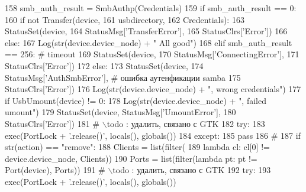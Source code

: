 \begin{DoxyCode}
158                 smb\_auth\_result = SmbAuthp(Credentials)
159                 \textcolor{keywordflow}{if} smb\_auth\_result == 0:
160                     \textcolor{keywordflow}{if} \textcolor{keywordflow}{not} Transfer(device,
161                                     usbdirectory,
162                                     Credentials):
163                         StatusSet(device,
164                                   StatusMsg[\textcolor{stringliteral}{'TransferError'}],
165                                   StatusClrs[\textcolor{stringliteral}{'Error'}])
166                     \textcolor{keywordflow}{else}:
167                         Log(str(device.device\_node) + \textcolor{stringliteral}{" All good"})
168                 \textcolor{keywordflow}{elif} smb\_auth\_result == 256:  \textcolor{comment}{# timeout}
169                     StatusSet(device,
170                               StatusMsg[\textcolor{stringliteral}{'ConnectingError'}],
171                               StatusClrs[\textcolor{stringliteral}{'Error'}])
172                 \textcolor{keywordflow}{else}:
173                     StatusSet(device,
174                               StatusMsg[\textcolor{stringliteral}{'AuthSmbError'}], \textcolor{comment}{# ошибка аутенфикации samba}
175                               StatusClrs[\textcolor{stringliteral}{'Error'}])
176                     Log(str(device.device\_node) + \textcolor{stringliteral}{", wrong credentials"})
177         \textcolor{keywordflow}{if} UsbUmount(device) != 0:
178             Log(str(device.device\_node) + \textcolor{stringliteral}{", failed umount"})
179             StatusSet(device, StatusMsg[\textcolor{stringliteral}{'UmountError'}],
180                       StatusClrs[\textcolor{stringliteral}{'Error'}])
181         \textcolor{comment}{# \(\backslash\)todo : удалить, связано с GTK}
182             \textcolor{keywordflow}{try}:
183                 exec(PortLock + \textcolor{stringliteral}{'.release()'}, locals(), globals())
184             \textcolor{keywordflow}{except}:
185                 \textcolor{keywordflow}{pass}
186         \textcolor{comment}{#}
187     \textcolor{keywordflow}{if} str(action) == \textcolor{stringliteral}{"remove"}:
188         Clients = list(filter(
189             \textcolor{keyword}{lambda} cl: cl[0] != device.device\_node, Clients))
190         Ports = list(filter(\textcolor{keyword}{lambda} pt: pt != Port(device), Ports))
191 \textcolor{comment}{# \(\backslash\)todo : удалить, связано с GTK}
192         \textcolor{keywordflow}{try}:
193             exec(PortLock + \textcolor{stringliteral}{'.release()'}, locals(), globals())

\end{DoxyCode}
